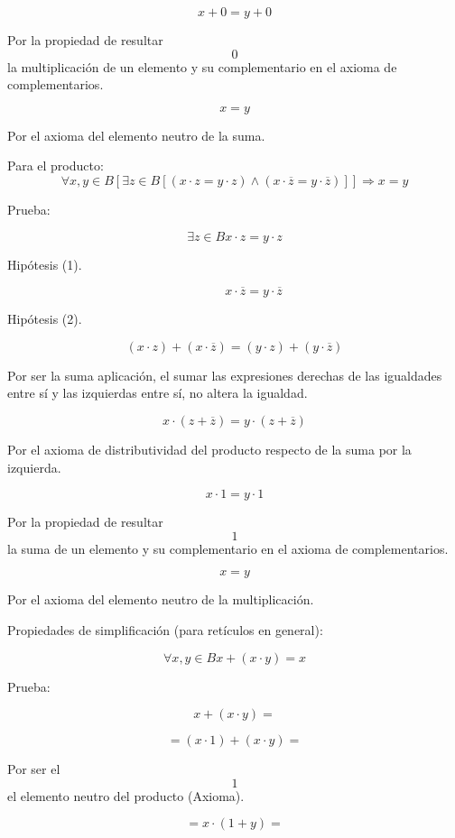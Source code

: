 \[{x + 0} = {y + 0}\]

Por la propiedad de resultar \[0\]la multiplicación de un elemento y su
complementario en el axioma de complementarios.

\[x = y\]

Por el axioma del elemento neutro de la suma.

Para el
producto:\[\forall x,{y \in B}\left\lbrack {\exists{z \in B}\left\lbrack {\left( {{x \cdot z} = {y \cdot z}} \right) \land \left( {{x \cdot \overline{z}} = {y \cdot \overline{z}}} \right)} \right\rbrack} \right\rbrack\Rightarrow{x = y}\]

Prueba:

\[{}{}{}\exists{z \in B}{}{}{}{{x \cdot z} = {y \cdot z}}\]

Hipótesis (1).

\[{}{}{}\phantom{\exists{z \in B}}{}{}{}{{x \cdot \overline{z}} = {y \cdot \overline{z}}}\]

Hipótesis (2).

\[{\left( {x \cdot z} \right) + \left( {x \cdot \overline{z}} \right)} = {\left( {y \cdot z} \right) + \left( {y \cdot \overline{z}} \right)}\]

Por ser la suma aplicación, el sumar las expresiones derechas de las
igualdades entre sí y las izquierdas entre sí, no altera la igualdad.

\[{x \cdot \left( {z + \overline{z}} \right)} = {y \cdot \left( {z + \overline{z}} \right)}\]

Por el axioma de distributividad del producto respecto de la suma por la
izquierda.

\[{x \cdot 1} = {y \cdot 1}\]

Por la propiedad de resultar \[1\]la suma de un elemento y su
complementario en el axioma de complementarios.

\[x = y\]

Por el axioma del elemento neutro de la multiplicación.

Propiedades de simplificación (para retículos en general):

\[\forall x,{y \in B}{{x + {({x \cdot y})}} = x}\]

Prueba:

\[{x + {({x \cdot y})}} = {}\]

\[{= {{({x \cdot 1})} + {({x \cdot y})}}} =\]

Por ser el \[1\] el elemento neutro del producto (Axioma).

\[{= {x \cdot {({1 + y})}}} =\]

